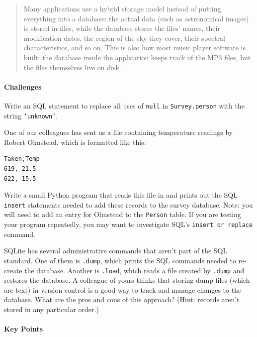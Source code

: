 \documentclass{book}
\begin{document}
\begin{quote}
Many applications use a hybrid storage model instead of putting
everything into a database: the actual data (such as astronomical
images) is stored in files, while the database stores the files' names,
their modification dates, the region of the sky they cover, their
spectral characteristics, and so on. This is also how most music player
software is built: the database inside the application keeps track of
the MP3 files, but the files themselves live on disk.
\end{quote}

\mbox{}\paragraph{Challenges}

\begin{swcenumerate}
\item
  Write an SQL statement to replace all uses of \texttt{null} in
  \texttt{Survey.person} with the string \texttt{'unknown'}.
\item
  One of our colleagues has sent us a  file
  containing temperature readings by Robert Olmstead, which is formatted
  like this:

\begin{verbatim}
Taken,Temp
619,-21.5
622,-15.5
\end{verbatim}

  Write a small Python program that reads this file in and prints out
  the SQL \texttt{insert} statements needed to add these records to the
  survey database. Note: you will need to add an entry for Olmstead to
  the \texttt{Person} table. If you are testing your program repeatedly,
  you may want to investigate SQL's \texttt{insert or replace} command.
\item
  SQLite has several administrative commands that aren't part of the SQL
  standard. One of them is \texttt{.dump}, which prints the SQL commands
  needed to re-create the database. Another is \texttt{.load}, which
  reads a file created by \texttt{.dump} and restores the database. A
  colleague of yours thinks that storing dump files (which are text) in
  version control is a good way to track and manage changes to the
  database. What are the pros and cons of this approach? (Hint: records
  aren't stored in any particular order.)
\end{swcenumerate}

\mbox{}\paragraph{Key Points}
\end{document}
